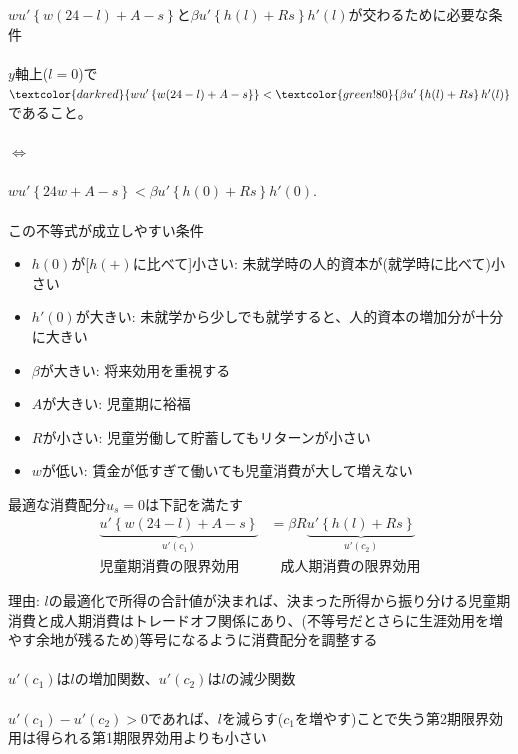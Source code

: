 \begin{frame}{}
$wu'\left\{w(24-l)+A-s\right\}$と$\beta u'\left\{h(l)+Rs\right\}h'(l)$が交わるために必要な条件\\~\\
\hfil $y$軸上($l=0$)で$\textcolor{darkred}{wu'\left\{w(24-l)+A-s\right\}}<\textcolor{green!80}{\beta u'\left\{h(l)+Rs\right\}h'(l)}$であること。\\~\\
\hfil $\Leftrightarrow$\\~\\
$wu'\left\{24w+A-s\right\}<\beta u'\left\{h(0)+Rs\right\}h'(0)$.\\~\\
この不等式が成立しやすい条件
\begin{itemize}
\vspace{1.0ex}\setlength{\itemsep}{1.0ex}\setlength{\baselineskip}{12pt}
\item	$h(0)$が[$h(+)$に比べて]小さい: 未就学時の人的資本が(就学時に比べて)小さい
\item	$h'(0)$が大きい: 未就学から少しでも就学すると、人的資本の増加分が十分に大きい
\item	$\beta$が大きい: 将来効用を重視する
\item	$A$が大きい: 児童期に裕福
\item	$R$が小さい: 児童労働して貯蓄してもリターンが小さい
\item	$w$が低い: 賃金が低すぎて働いても児童消費が大して増えない
\end{itemize}
\end{frame}





\begin{frame}{}
最適な消費配分$u_{s}=0$は下記を満たす
\[
\begin{aligned}
\underbrace{u'\left\{w(24-l)+A-s\right\}}_{u'(c_{1})}&=\beta R\underbrace{u'\left\{h(l)+Rs\right\}}_{u'(c_{2})}\\
\mbox{児童期消費の限界効用} &\phantom{=} \mbox{成人期消費の限界効用}
\end{aligned}
\]

\vspace{2ex}
\pause
理由: $l$の最適化で所得の合計値が決まれば、決まった所得から振り分ける児童期消費と成人期消費はトレードオフ関係にあり、(不等号だとさらに生涯効用を増やす余地が残るため)等号になるように消費配分を調整する\\~\\
$u'(c_{1})$は$l$の増加関数、$u'(c_{2})$は$l$の減少関数\\~\\
$u'(c_{1})-u'(c_{2})>0$であれば、$l$を減らす($c_{1}$を増やす)ことで失う第2期限界効用は得られる第1期限界効用よりも小さい
\end{frame}

